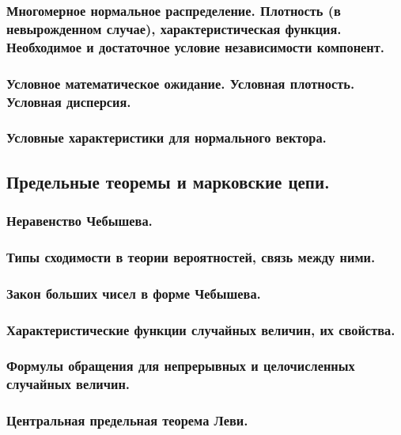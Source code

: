 \documentclass[14pt]{extarticle}
\theoremstyle{breakstyle}
\begin{document}
\subsubsection{Многомерное нормальное распределение. Плотность (в невырожденном случае), характеристическая функция. Необходимое и достаточное условие независимости компонент.}

\subsubsection{Условное математическое ожидание. Условная плотность. Условная дисперсия.}

\subsubsection{Условные характеристики для нормального вектора.}


\subsection{Предельные теоремы и марковские цепи.}

\subsubsection{Неравенство Чебышева.}

\subsubsection{Типы сходимости в теории вероятностей, связь между ними.}

\subsubsection{Закон больших чисел в форме Чебышева.}

\subsubsection{Характеристические функции случайных величин, их свойства.}

\subsubsection{Формулы обращения для непрерывных и целочисленных случайных величин.}

\subsubsection{Центральная предельная теорема Леви.}
\end{document}
